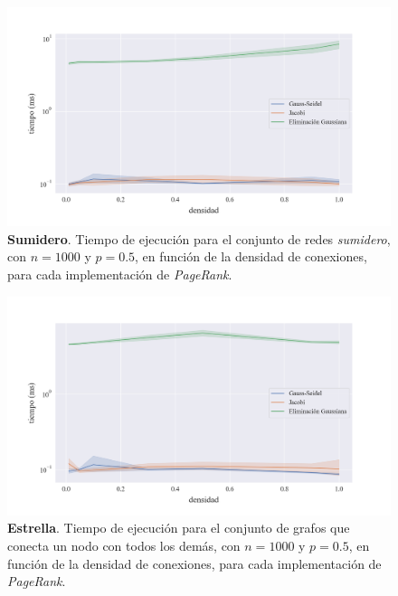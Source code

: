 \vspace{1em}
\begin{figure}[!htbp]
    \centering
    \includegraphics[width=.9\textwidth]{files/src/.media/densidad_red_sumidero.png}
    \caption{\textbf{Sumidero}. Tiempo de ejecución para el conjunto de redes \textit{sumidero}, con $n = 1000$ y $p = 0.5$, en función de la densidad de conexiones, para cada implementación de \textit{PageRank}.}
    \label{densidad_red_sumidero}
\end{figure}

\vspace{1em}
\begin{figure}[!htbp]
    \centering
    \includegraphics[width=.9\textwidth]{files/src/.media/densidad_uno_a_todos.png}
    \caption{\textbf{Estrella}. Tiempo de ejecución para el conjunto de grafos que conecta un nodo con todos los demás, con $n = 1000$ y $p = 0.5$, en función de la densidad de conexiones, para cada implementación de \textit{PageRank}.}
    \label{densidad_uno_a_todos}
\end{figure}

